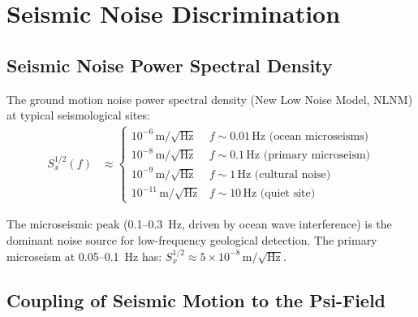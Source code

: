 \documentclass[aps,prd,twocolumn,superscriptaddress,nofootinbib]{revtex4-2}
\begin{document}
\section{Seismic Noise Discrimination}
\label{sec:seismic}

\subsection{Seismic Noise Power Spectral Density}

The ground motion noise power spectral density (New Low Noise Model,
NLNM) at typical seismological sites:
\begin{align}
  S_x^{1/2}(f) &\approx \begin{cases}
    10^{-6}\,\mathrm{m/\sqrt{Hz}} & f \sim 0.01\,\mathrm{Hz}
    \text{ (ocean microseisms)} \\
    10^{-8}\,\mathrm{m/\sqrt{Hz}} & f \sim 0.1\,\mathrm{Hz}
    \text{ (primary microseism)} \\
    10^{-9}\,\mathrm{m/\sqrt{Hz}} & f \sim 1\,\mathrm{Hz}
    \text{ (cultural noise)}  \\
    10^{-11}\,\mathrm{m/\sqrt{Hz}} & f \sim 10\,\mathrm{Hz}
    \text{ (quiet site)}
  \end{cases}
  \label{eq:seismic-psd}
\end{align}

The microseismic peak (0.1--0.3~Hz, driven by ocean wave interference)
is the dominant noise source for low-frequency geological detection.
The primary microseism at 0.05--0.1~Hz has:
$S_x^{1/2} \approx 5\times10^{-8}\,\mathrm{m/\sqrt{Hz}}$.

\subsection{Coupling of Seismic Motion to the Psi-Field}
\end{document}
